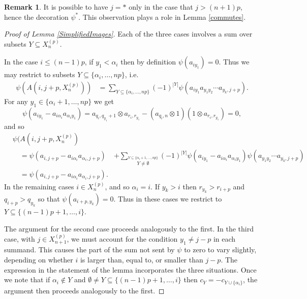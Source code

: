 \documentclass[11pt]{amsart}
\def\a{\alpha}
\theoremstyle{definition}
\newtheorem{rem}[thm]{Remark}
\begin{document}
\begin{rem}It is possible to have $j=\ast$ only in the case that $j>(n+1)p$, hence the decoration $\psi^\ast$. This observation plays a role in Lemma \ref{commutes}.
\end{rem}
\begin{proof}[Proof of Lemma \ref{SimplifiedImages}] Each of the three cases involves a sum over subsets $Y\subseteq X_n^{(p)}$. 

In the case $i\le(n-1)p$, if $y_1<\a_i$ then by definition $\psi(a_{iy_1})=0$. Thus we may restrict to subsets $Y\subseteq\{\a_i,\ldots,np\}$, i.e.
        \begin{align*}
        \psi(A(i,j+p,X_n^{(p)}))  &= \sum_{Y\subseteq \{\a_i,\ldots,np\}}(-1)^{|Y|}\psi(a_{iy_1}a_{y_1y_2}\cdots a_{y_k,j+p}).
        \end{align*}
For any $y_1\in\{\a_i+1,\ldots,np\}$ we get 
{\small
  \[\psi(a_{iy_1}-a_{i\a_i}a_{\a_iy_1}) = a_{q_i,q_{y_1}+1}\otimes a_{r_i,r_{y_1}}-(a_{q_i,n}\otimes 1)(1\otimes a_{r_i,r_{y_1}}) = 0,\]
}
\noindent and so 
{\small
        \begin{align*}
          &\psi(A(i,j+p,X_n^{(p)})                  & \\
          &\quad =\psi(a_{i,j+p}-a_{i\a_i}a_{\a_i,j+p}) &+\sum_{{\scriptscriptstyle \overset{Y\subseteq \{\a_i+1,\ldots,np\}}{Y\ne\emptyset}}}(-1)^{|Y|}\psi(a_{iy_1}-a_{i\a_i}a_{\a_iy_1})\psi(a_{y_1y_2}\cdots a_{y_k,j+p})\\
          &\quad =\psi(a_{i,j+p}-a_{i\a_i}a_{\a_i,j+p}).
        \end{align*}
}
In the remaining cases $i\in X_n^{(p)}$, and so $\a_i=i$. If $y_k>i$ then $r_{y_k}>r_{i+p}$ and $q_{i+p}>q_{y_k}$ so that $\psi(a_{i+p,y_k})=0$. Thus in these cases we restrict to $Y\subseteq\{(n-1)p+1,\ldots,i\}$. 

The argument for the second case proceeds analogously to the first. In the third case, with $j\in X_{n+1}^{(p)}$, we must account for the condition $y_1\ne j-p$ in each summand. This causes the part of the sum not sent by $\psi$ to zero to vary slightly, depending on whether $i$ is larger than, equal to, or smaller than $j-p$. The expression in the statement of the lemma incorporates the three situations.  Once we note that if $\a_i \not\in Y$ and $\emptyset \ne Y\subseteq\{(n-1)p+1,\ldots,i\}$ then $c_Y = -c_{Y\cup \{\a_i\}}$, the argument then proceeds analogously to the first.
\end{proof}
\end{document}
